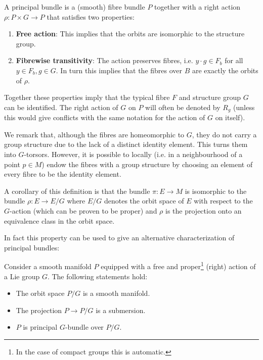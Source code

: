     \begin{definition}
        A principal bundle is a (smooth) fibre bundle $P$ together with a right action $\rho:P\times G\rightarrow P$ that satisfies two properties:
        \begin{enumerate}
            \item \textbf{Free action}: This implies that the orbits are isomorphic to the structure group.
            \item \textbf{Fibrewise transitivity}: The action preserves fibres, i.e. $y\cdot g\in F_b$ for all $y\in F_b, g\in G$. In turn this implies that the fibres over $B$ are exactly the orbits of $\rho$.
        \end{enumerate}
        Together these properties imply that the typical fibre $F$ and structure group $G$ can be identified. The right action of $G$ on $P$ will often be denoted by $R_g$ (unless this would give conflicts with the same notation for the action of $G$ on itself).
    \end{definition}
    \begin{remark}[$G$-torsor]\label{diff:fibre_torsor}
        We remark that, although the fibres are homeomorphic to $G$, they do not carry a group structure due to the lack of a distinct identity element. This turns them into $G$-torsors. However, it is possible to locally (i.e. in a neighbourhood of a point $p\in M$) endow the fibres with a group structure by choosing an element of every fibre to be the identity element.
    \end{remark}
    \begin{property}
        A corollary of this definition is that the bundle $\pi:E\rightarrow M$ is isomorphic to the bundle $\rho:E\rightarrow E/G$ where $E/G$ denotes the orbit space of $E$ with respect to the $G$-action (which can be proven to be proper) and $\rho$ is the projection onto an equivalence class in the orbit space.
    \end{property}
    In fact this property can be used to give an alternative characterization of principal bundles:
    \begin{property}
        Consider a smooth manifold $P$ equipped with a free and proper\footnote{In the case of compact groups this is automatic.} (right) action of a Lie group $G$. The following statements hold:
        \begin{itemize}
            \item The orbit space $P/G$ is a smooth manifold.
            \item The projection $P\rightarrow P/G$ is a submersion.
            \item $P$ is principal $G$-bundle over $P/G$.
        \end{itemize}
    \end{property}

